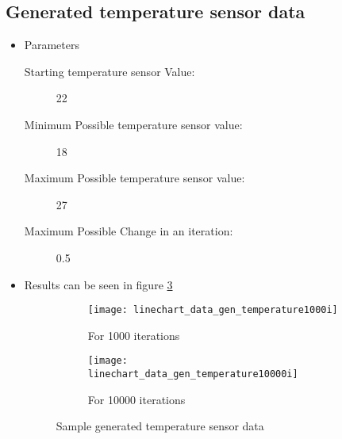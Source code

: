     \subsection{Generated temperature sensor data}
        \begin{itemize}
            \item Parameters
                \begin{description}
                    \item[Starting temperature sensor Value:] 22
                    \item[Minimum Possible temperature sensor value:] 18
                    \item[Maximum Possible temperature sensor value:] 27
                    \item[Maximum Possible Change in an iteration:] 0.5
                \end{description}
            \item Results can be seen in figure \ref{fig:gen_temperature}
                \begin{figure}
                    \centering
                    \captionsetup{type=figure}
                    \begin{subfigure}[b]{0.45\textwidth}
                        \centering
                        \texttt{[image: linechart\_data\_gen\_temperature1000i]}
                        \caption{For 1000 iterations}
                        \label{chart:gen_temperature_1000}
                    \end{subfigure}
                    \hfill
                    \begin{subfigure}[b]{0.45\textwidth}
                        \centering
                        \texttt{[image: linechart\_data\_gen\_temperature10000i]}
                        \caption{For 10000 iterations}
                        \label{chart:gen_temperature_10000}
                    \end{subfigure}
                    
                    \caption{Sample generated temperature sensor data }
                    \label{fig:gen_temperature}
                \end{figure}
            \end{itemize}

